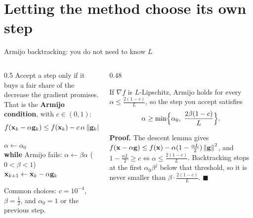 \section{Letting the method choose its own step}

\begin{frame}{Armijo backtracking: you do not need to know $L$}
  \begin{columns}[T]
    \begin{column}{0.5\textwidth}
      Accept a step only if it buys a fair share of the decrease the gradient promises.
      That is the \textbf{Armijo condition}, with $c\in(0,1)$:
      \[
        f(\mathbf{x}_k-\alpha\mathbf{g}_k)\le f(\mathbf{x}_k)-c\,\alpha\left\lVert \mathbf{g}_k \right\rVert^2 .
      \]
      \begin{thmbox}
        \small
        $\alpha\gets\alpha_0$\\
        \textbf{while} Armijo fails: $\alpha\gets\beta\alpha$ \quad ($0<\beta<1$)\\
        $\mathbf{x}_{k+1}\gets\mathbf{x}_k-\alpha\mathbf{g}_k$
      \end{thmbox}
      \footnotesize Common choices: $c = 10^{-4}$, $\beta = \frac12$, and $\alpha_0 = 1$ or the previous step.
    \end{column}
    \begin{column}{0.48\textwidth}
      \begin{thmbox}
        \small If $\nabla f$ is $L$-Lipschitz, Armijo holds for every $\alpha\le\frac{2(1-c)}{L}$, so the step you accept satisfies
        \[ \alpha\ge\min\Bigl\{\alpha_0,\ \frac{2\beta(1-c)}{L}\Bigr\}. \]
      \end{thmbox}
      \small\textbf{Proof.}
      \pause
      The descent lemma gives $f(\mathbf{x}-\alpha\mathbf{g})\le f(\mathbf{x})-\alpha(1-\frac{\alpha L}{2})\left\lVert \mathbf{g} \right\rVert^2$, and
      $1-\frac{\alpha L}2\ge c\iff\alpha\le\frac{2(1-c)}{L}$.
      \pause
      Backtracking stops at the first $\alpha_0\beta^j$ below that threshold, so it is never smaller than $\beta\cdot\frac{2(1-c)}{L}$. $\blacksquare$
    \end{column}
  \end{columns}
\end{frame}

